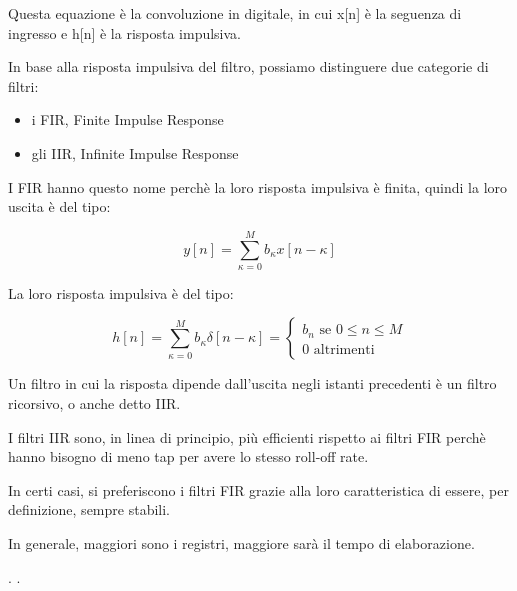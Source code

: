 Questa equazione è la convoluzione in digitale, in cui x[n] è la seguenza di ingresso e h[n] è la risposta impulsiva. \newline  

In base alla risposta impulsiva del filtro, possiamo distinguere due categorie di filtri: 

\begin{itemize}
    \item i FIR, Finite Impulse Response 
    \item gli IIR, Infinite Impulse Response 
\end{itemize}

I FIR hanno questo nome perchè la loro risposta impulsiva è finita, quindi la loro uscita è del tipo: 

{
    \Large 
    \begin{equation}
        y[n] = \sum_{\kappa = 0}^{M} b_\kappa x[n - \kappa]
    \end{equation}
}


La loro risposta impulsiva è del tipo: 

{
    \Large 
    \begin{equation}
        h[n] = \sum_{\kappa = 0}^{M} b_\kappa \delta[n - \kappa] = 
        \begin{cases}
            b_n \text{ se } 0 \leq n \leq M \\ 
            0 \text{ altrimenti }
        \end{cases}
    \end{equation}
}

Un filtro in cui la risposta dipende dall'uscita negli istanti precedenti è un filtro ricorsivo, o anche detto IIR. \newline 


I filtri IIR sono, in linea di principio, più efficienti rispetto ai filtri FIR perchè hanno bisogno di meno tap per
avere lo stesso roll-off rate. \newline 

In certi casi, si preferiscono i filtri FIR grazie alla loro caratteristica di essere, per definizione, sempre stabili. \newline 

In generale, maggiori sono i registri, maggiore sarà il tempo di elaborazione. \newline 

\newpage 
. 
\newpage
. 
\newpage
